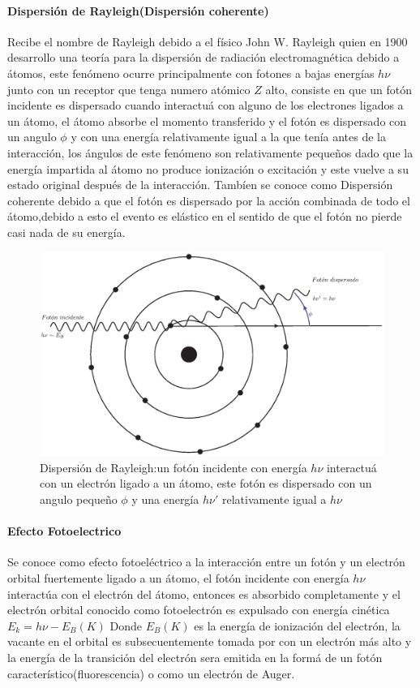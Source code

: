 \paragraph{Dispersión de Rayleigh(Dispersión coherente)}
Recibe el nombre de Rayleigh debido a el físico John W. Rayleigh quien en 1900 desarrollo una teoría para la dispersión de radiación electromagnética debido a átomos, este fenómeno ocurre principalmente con fotones a bajas energías $h\nu$ junto con un receptor que tenga numero atómico $Z$ alto, consiste en que un fotón incidente es dispersado cuando interactuá con alguno de los electrones ligados a un átomo, el átomo absorbe el momento transferido y el fotón es dispersado con un angulo $\phi$ y con una energía relativamente igual a la que tenía antes de la interacción, los ángulos de este fenómeno son relativamente pequeños dado que la energía impartida al átomo no produce ionización o excitación y este vuelve a su estado original después de la interacción\cite{Podgorsak}.
Tambíen se conoce como Dispersión coherente debido a que el fotón es dispersado por  la acción combinada de todo el átomo,debido a esto el evento es elástico en el sentido de que el fotón no pierde casi nada de su energía\cite{Frank}.

\begin{figure}[htbp]
    \centering
    \includegraphics[width=.71\linewidth]{./Figures/Ray.eps}
    \caption[Dispersión de Rayleigh]{Dispersión de Rayleigh:un fotón incidente con energía $h\nu$ interactuá con un electrón ligado a un átomo, este fotón es dispersado con un angulo pequeño $\phi$ y una energía $h\nu '$ relativamente igual a $h\nu$ }
    \label{fig:UoC}
\end{figure}


\paragraph{Efecto Fotoelectrico}

Se conoce como efecto fotoeléctrico a la interacción entre un fotón y un electrón orbital fuertemente ligado a un átomo, el fotón incidente con energía $h\nu$ interactúa con el electrón del átomo, entonces es absorbido completamente y el electrón orbital conocido como fotoelectrón es expulsado con energía cinética $E_k=h\nu-E_B(K)$ Donde $E_B(K)$ es la energía de ionización del electrón, la vacante en el orbital es subsecuentemente tomada por con un electrón más alto y la energía de la transición del electrón sera emitida en la formá de un fotón característico(fluorescencia) o como un electrón de Auger.

